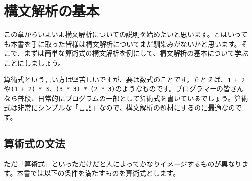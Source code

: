 \hypertarget{chapter2-ux69cbux6587ux89e3ux6790ux306eux57faux672c}{%
\chapter{構文解析の基本}\label{chapter2-ux69cbux6587ux89e3ux6790ux306eux57faux672c}}

この章からいよいよ構文解析についての説明を始めたいと思います。とはいっても本書を手に取った皆様は構文解析についてまだ馴染みがないかと思います。そこで、まずは簡単な算術式の構文解析を例にして、構文解析の基本について学ぶことにしましょう。

算術式という言い方は堅苦しいですが、要は数式のことです。たとえば、\texttt{1\ +\ 2}や\texttt{(1\ +\ 2)\ *\ 3}、\texttt{(3\ *\ 3)\ *\ (2\ *\ 3)}のようなものです。プログラマーの皆さんなら普段、日常的にプログラムの一部として算術式を書いているでしょう。算術式は非常にシンプルな「言語」なので、構文解析の題材にするのに最適なのです。

\hypertarget{chapter2-ux7b97ux8853ux5f0fux306eux6587ux6cd5}{%
\section{算術式の文法}\label{chapter2-ux7b97ux8853ux5f0fux306eux6587ux6cd5}}

ただ「算術式」といっただけだと人によってかなりイメージするものが異なります。本書では以下の条件を満たすものを算術式とします。

